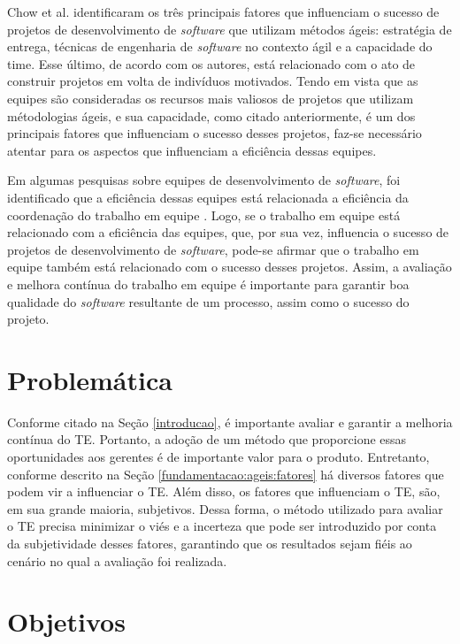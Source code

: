 Chow et al. \cite{chow} identificaram os três principais fatores que influenciam o sucesso de projetos de desenvolvimento de \textit{software} que utilizam métodos ágeis: estratégia de entrega, técnicas de engenharia de \textit{software} no contexto ágil e a capacidade do time. Esse último, de acordo com os autores, está relacionado com o ato de construir projetos em volta de indivíduos motivados. Tendo em vista que as equipes são consideradas os recursos mais valiosos de projetos que utilizam métodologias ágeis, e sua capacidade, como citado anteriormente, é um dos principais fatores que influenciam o sucesso desses projetos, faz-se necessário atentar para os aspectos que influenciam a eficiência dessas equipes.

Em algumas pesquisas sobre equipes de desenvolvimento de \textit{software}, foi identificado que a eficiência dessas equipes está relacionada a eficiência da coordenação do trabalho em equipe \cite{kraut} \cite{hoegl}. Logo, se o trabalho em equipe está relacionado com a eficiência das equipes, que, por sua vez, influencia o sucesso de projetos de desenvolvimento de \textit{software}, pode-se afirmar que o trabalho em equipe também está relacionado com o sucesso desses projetos. Assim, a avaliação e melhora contínua do trabalho em equipe é importante para garantir boa qualidade do \textit{software} resultante de um processo, assim como o sucesso do projeto.

\section{Problemática}
\label{introducao:problematica}

Conforme citado na Seção \ref{introducao}, é importante avaliar e garantir a melhoria contínua do TE. Portanto, a adoção de um método que proporcione essas oportunidades aos gerentes é de importante valor para o produto. Entretanto, conforme descrito na Seção \ref{fundamentacao:ageis:fatores} há diversos fatores que podem vir a influenciar o TE. Além disso, os fatores que influenciam o TE, são, em sua grande maioria, subjetivos. Dessa forma, o método utilizado para avaliar o TE precisa minimizar o viés e a incerteza que pode ser introduzido por conta da subjetividade desses fatores, garantindo que os resultados sejam fiéis ao cenário no qual a avaliação foi realizada.

\section{Objetivos}
\label{introducao:objetivos}

